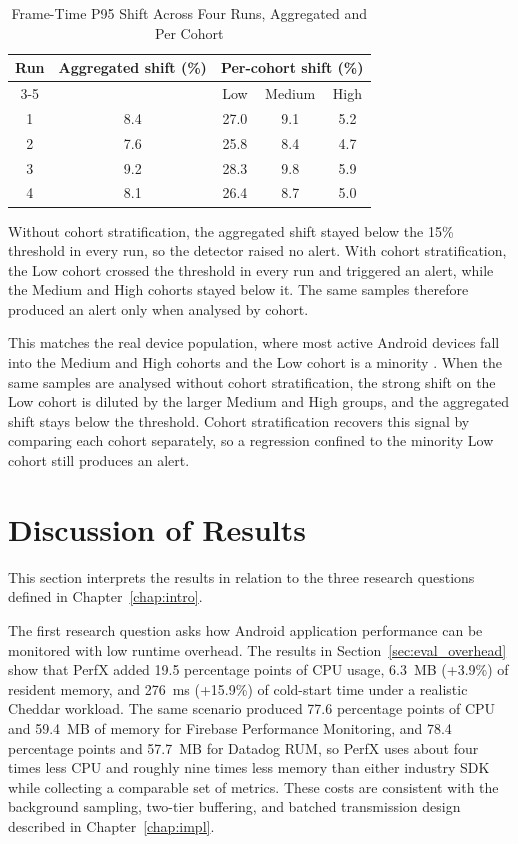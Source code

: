 \begin{table}[htbp]
    \centering
    \small
    \caption{Frame-Time P95 Shift Across Four Runs, Aggregated and Per Cohort}
    \label{tab:eval_tier_repeated}
    \begin{tabular}{ccccc}
        \toprule
        \multirow{2}{*}{Run} & \multirow{2}{*}{Aggregated shift (\%)} & \multicolumn{3}{c}{Per-cohort shift (\%)} \\
        \cmidrule(lr){3-5}
        & & Low & Medium & High \\
        \midrule
        1 & 8.4 & 27.0 & 9.1 & 5.2 \\
        2 & 7.6 & 25.8 & 8.4 & 4.7 \\
        3 & 9.2 & 28.3 & 9.8 & 5.9 \\
        4 & 8.1 & 26.4 & 8.7 & 5.0 \\
        \bottomrule
    \end{tabular}
\end{table}

Without cohort stratification, the aggregated shift stayed below the 15\% threshold in every run, so the detector raised no alert. With cohort stratification, the Low cohort crossed the threshold in every run and triggered an alert, while the Medium and High cohorts stayed below it. The same samples therefore produced an alert only when analysed by cohort.

This matches the real device population, where most active Android devices fall into the Medium and High cohorts and the Low cohort is a minority \cite{GooglePlayDeviceCatalog}. When the same samples are analysed without cohort stratification, the strong shift on the Low cohort is diluted by the larger Medium and High groups, and the aggregated shift stays below the threshold. Cohort stratification recovers this signal by comparing each cohort separately, so a regression confined to the minority Low cohort still produces an alert.

\section{Discussion of Results}
\label{sec:eval_discussion}

This section interprets the results in relation to the three research questions defined in Chapter~\ref{chap:intro}.

The first research question asks how Android application performance can be monitored with low runtime overhead. The results in Section~\ref{sec:eval_overhead} show that PerfX added 19.5 percentage points of CPU usage, 6.3~MB (+3.9\%) of resident memory, and 276~ms (+15.9\%) of cold-start time under a realistic Cheddar workload. The same scenario produced 77.6 percentage points of CPU and 59.4~MB of memory for Firebase Performance Monitoring, and 78.4 percentage points and 57.7~MB for Datadog RUM, so PerfX uses about four times less CPU and roughly nine times less memory than either industry SDK while collecting a comparable set of metrics. These costs are consistent with the background sampling, two-tier buffering, and batched transmission design described in Chapter~\ref{chap:impl}.

